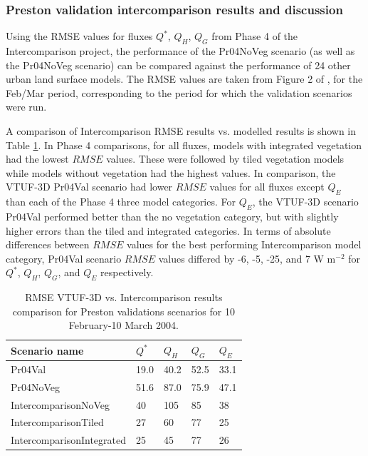 \documentclass[final,3p,times,authoryear]{elsarticle}
\begin{document}
\subsubsection{Preston validation intercomparison results and discussion}\label{sec:interresults}

Using the RMSE values for fluxes $Q^{*}$, $Q_{H}$, $Q_{G}$ from Phase 4 of the Intercomparison project, the performance of the Pr04NoVeg scenario (as well as the Pr04NoVeg scenario) can be compared against the performance of 24 other urban land surface models. The RMSE values are taken from Figure 2 of \cite{Best2012}, for the Feb/Mar period, corresponding to the period for which the validation scenarios were run. 

A comparison of Intercomparison RMSE results vs. modelled results is shown in Table \ref{fig:prestonrmse}. In Phase 4 comparisons, for all fluxes, models with integrated vegetation had the lowest $RMSE$ values. These were followed by tiled vegetation models while models without vegetation had the highest values. In comparison, the VTUF-3D Pr04Val scenario had lower $RMSE$ values for all fluxes except $Q_{E}$ than each of the Phase 4 three model categories. For $Q_{E}$, the VTUF-3D scenario Pr04Val performed better than the no vegetation category, but with slightly higher errors than the tiled and integrated categories. In terms of absolute differences between $RMSE$ values for the best performing Intercomparison model category, Pr04Val scenario $RMSE$ values differed by -6, -5, -25, and 7 W m$^{-2}$ for $Q^{*}$, $Q_{H}$, $Q_{G}$, and $Q_{E}$ respectively.

\begin{center}
\begin{table}[!htbp]
\caption{RMSE VTUF-3D vs. Intercomparison results \citep{Best2012} comparison for Preston validations scenarios for 10 February-10 March 2004.\label{fig:prestonrmse}} 
\begin{tabular}{  | l | l | l|l|l| } 
\hline \textbf{Scenario name} &\textbf{$Q^{*}$}& \textbf{$Q_{H}$}& \textbf{$Q_{G}$}& \textbf{$Q_{E}$}  \\ \hline
Pr04Val & 19.0&	40.2&	52.5&	33.1    \\ \hline
Pr04NoVeg & 51.6&	87.0&	75.9&	47.1  \\ \hline	
IntercomparisonNoVeg & 40&	105&	85&	38   \\ \hline
IntercomparisonTiled &  27&	60&	77&	25  \\ \hline
IntercomparisonIntegrated & 25&	45&	77&	26   \\ \hline
  \end{tabular} 
\end{table}
\end{center} 
\end{document}
